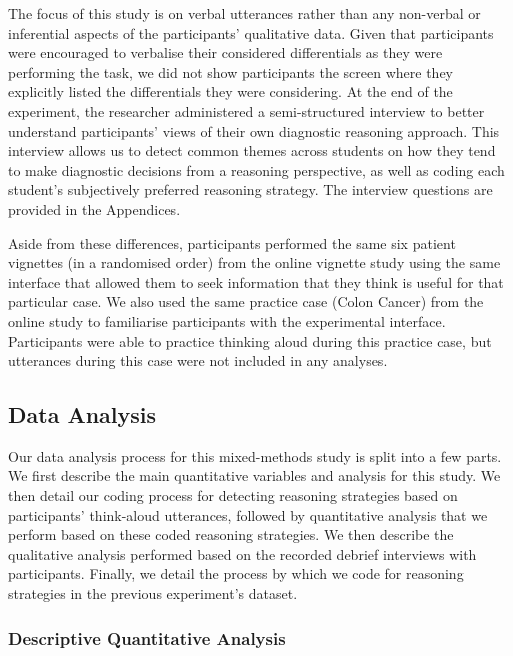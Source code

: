 \documentclass[a4paper, nobind]{templates/ociamthesis}
\begin{document}
\hfill\break
The focus of this study is on verbal utterances rather than any non-verbal or inferential aspects of the participants' qualitative data. Given that participants were encouraged to verbalise their considered differentials as they were performing the task, we did not show participants the screen where they explicitly listed the differentials they were considering. At the end of the experiment, the researcher administered a semi-structured interview to better understand participants' views of their own diagnostic reasoning approach. This interview allows us to detect common themes across students on how they tend to make diagnostic decisions from a reasoning perspective, as well as coding each student's subjectively preferred reasoning strategy. The interview questions are provided in the Appendices.

\hfill\break
Aside from these differences, participants performed the same six patient vignettes (in a randomised order) from the online vignette study using the same interface that allowed them to seek information that they think is useful for that particular case. We also used the same practice case (Colon Cancer) from the online study to familiarise participants with the experimental interface. Participants were able to practice thinking aloud during this practice case, but utterances during this case were not included in any analyses.

\subsection{Data Analysis}\label{data-analysis-1}

Our data analysis process for this mixed-methods study is split into a few parts. We first describe the main quantitative variables and analysis for this study. We then detail our coding process for detecting reasoning strategies based on participants' think-aloud utterances, followed by quantitative analysis that we perform based on these coded reasoning strategies. We then describe the qualitative analysis performed based on the recorded debrief interviews with participants. Finally, we detail the process by which we code for reasoning strategies in the previous experiment's dataset.

\subsubsection{Descriptive Quantitative Analysis}\label{descriptive-quantitative-analysis}
\end{document}
